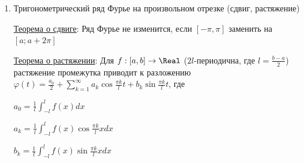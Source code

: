 \documentclass[12pt]{article}
\begin{document}
\begin{enumerate}
    $\frac{a_0}{2} = \frac{1}{2\pi} \int_{-\pi}^\pi f(x) dx$ 
    
    $a_k = \frac{1}{\pi} \int_{-\pi}^\pi f(x) \cos kx dx$
    
    $b_k = \frac{1}{\pi} \int_{-\pi}^\pi f(x) \sin kx dx$

    \hyperlink{dirichletstheorem}{Теорема Дирихле}:

    \Ths $f(x)$ - $2\pi$-периодична, на $[-\pi, \pi]$ $f(x)$ - кусочно монотонна и ограничена (то есть имеет конечное число конечных разрывов). 
    Тогда в точках непрерывности $f(x)$ представляется рядом Фурье $S(x) = \frac{a_0}{2} + \sum_{n = 1}^\infty (a_n \cos nx + b_n \sin nx)$,
    а в точках разрыва $x_0$ $S(x_0) = \frac{1}{2} (f(x_0 + 0) + f(x_0 - 0))$

    \item Тригонометрический ряд Фурье на произвольном отрезке (сдвиг, растяжение)

    \hyperlink{shifttheorem}{Теорема о сдвиге}:  Ряд Фурье не изменится, если $[-\pi, \pi]$ заменить на $[a; a + 2\pi]$

    \hyperlink{stretchingtheorem}{Теорема о растяжении}:  Для $f : [a, b] \to \Real$ ($2l$-периодична, где $l = \frac{b - a}{2}$) растяжение промежутка приводит к разложению
    $\varphi(t) = \frac{a_0}{2} + \sum_{k = 1}^\infty a_k \cos \frac{\pi k}{l} t + b_k \sin \frac{\pi k}{l} t$, где

    $a_0 = \frac{1}{l} \int_{-l}^l f(x) dx$

    $a_k = \frac{1}{l} \int_{-l}^l f(x) \cos \frac{\pi k}{l} x dx$

    $b_k = \frac{1}{l} \int_{-l}^l f(x) \sin \frac{\pi k}{l} x dx$

    

\end{enumerate}
\end{document}
